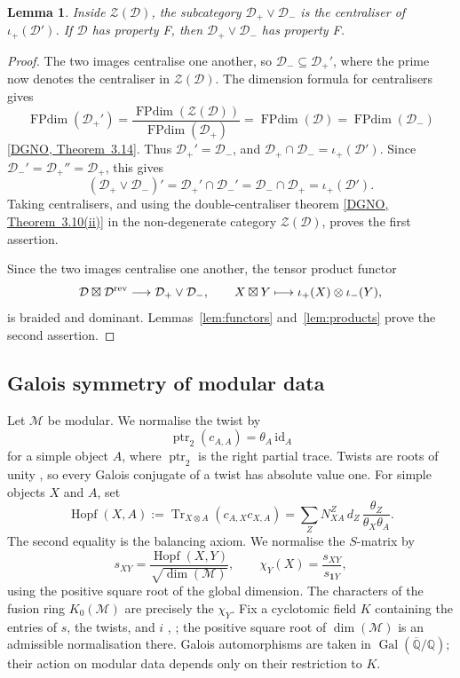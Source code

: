 \documentclass[11pt,oneside]{amsart}
\newtheorem{lemma}[theorem]{Lemma}
\theoremstyle{remark}
\newcommand{\D}{\mathcal D}
\newcommand{\M}{\mathcal M}
\newcommand{\one}{\mathbf 1}
\newcommand{\FP}{\operatorname{FPdim}}
\newcommand{\Tr}{\operatorname{Tr}}
\newcommand{\ptr}{\operatorname{ptr}}
\newcommand{\Hopf}{\operatorname{Hopf}}
\newcommand{\sourcecite}[3]{\nocite{#1}\href{#3}{[#1, #2]}}
\begin{document}
\begin{lemma}\label{lem:centre}
Inside $\mathcal Z(\D)$, the subcategory $\D_+\vee\D_-$ is the centraliser of
$\iota_+(\D')$. If $\D$ has property F, then $\D_+\vee\D_-$ has property F.
\end{lemma}

\begin{proof}
The two images centralise one another, so $\D_-\subseteq\D_+'$, where the prime
now denotes the centraliser in $\mathcal Z(\D)$. The dimension formula for
centralisers gives
\[
\FP(\D_+')=\frac{\FP(\mathcal Z(\D))}{\FP(\D_+)}
=\FP(\D)=\FP(\D_-)
\]
\sourcecite{DGNO}{Theorem~3.14}{https://arxiv.org/html/0906.0620\#S3.Thmtheorem14}. Thus $\D_+'=\D_-$, and
$\D_+\cap\D_-=\iota_+(\D')$. Since $\D_-'=\D_+''=\D_+$, this gives
\[
(\D_+\vee\D_-)'=\D_+'\cap\D_-'=\D_-\cap\D_+=\iota_+(\D').
\]
Taking centralisers, and using the double-centraliser theorem
\sourcecite{DGNO}{Theorem~3.10(ii)}{https://arxiv.org/html/0906.0620\#S3.Thmtheorem10}
in the non-degenerate category $\mathcal Z(\D)$, proves the first assertion.

Since the two images centralise one another, the tensor product functor
\[
\D\boxtimes\D^{\rm rev}\longrightarrow\D_+\vee\D_-,\qquad
X\boxtimes Y\longmapsto\iota_+(X)\otimes\iota_-(Y),
\]
is braided and dominant. Lemmas~\ref{lem:functors} and~\ref{lem:products}
prove the second assertion.
\end{proof}

\subsection{Galois symmetry of modular data}

Let $\M$ be modular. We normalise the twist by
\[
\ptr_2(c_{A,A})=\theta_A\,\mathrm{id}_A
\]
for a simple object $A$, where $\ptr_2$ is the right partial trace. Twists are
roots of unity \cite[Theorem~5.1]{E}, so every Galois conjugate of a twist has absolute value
one. For simple objects $X$ and $A$, set
\begin{equation}\label{eq:hopf}
\Hopf(X,A):=\Tr_{X\otimes A}(c_{A,X}c_{X,A})
=\sum_ZN_{XA}^Z\,d_Z\,\frac{\theta_Z}{\theta_X\theta_A}.
\end{equation}
The second equality is the balancing axiom. We normalise the $S$-matrix by
\[
s_{XY}=\frac{\Hopf(X,Y)}{\sqrt{\dim(\M)}},\qquad
\chi_Y(X)=\frac{s_{XY}}{s_{\one Y}},
\]
using the positive square root of the global dimension. The characters of the
fusion ring $K_0(\M)$ are precisely the $\chi_Y$. Fix a cyclotomic field $K$
containing the entries of $s$, the twists, and $i$
\cite[Theorem~7.1]{NS}, \cite[Theorem~II]{DLN}; the positive square root of
$\dim(\M)$ is an admissible normalisation there.
Galois automorphisms are taken in
$\operatorname{Gal}(\overline{\mathbb Q}/\mathbb Q)$; their action on modular
data depends only on their restriction to $K$.
\end{document}
